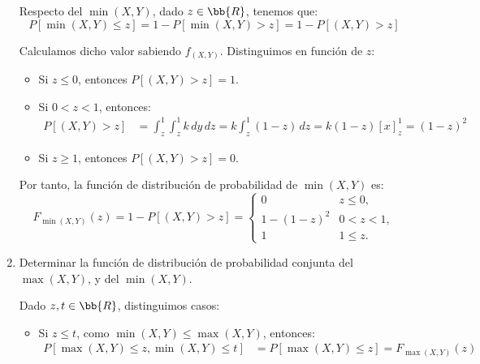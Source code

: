 \documentclass[12pt]{article}
\begin{document}
\begin{ejercicio}
\begin{enumerate}
            Respecto del $\min(X,Y)$, dado $z\in \bb{R}$, tenemos que:
            \begin{equation*}
                P[\min(X,Y)\leq z]=1-P[\min(X,Y)>z]=1-P[(X,Y)>z]
            \end{equation*}
    
            Calculamos dicho valor sabiendo $f_{(X,Y)}$. Distinguimos en función de $z$:
            \begin{itemize}
                \item Si $z\leq 0$, entonces $P[(X,Y)>z]=1$.
    
                \item Si $0<z<1$, entonces:
                \begin{align*}
                    P[(X,Y)>z]&=\int_{z}^{1}\int_{z}^{1} k \, dy \, dz = k\int_{z}^{1} (1-z) \, dz
                    = k(1-z)\left[x\right]_{z}^{1} = (1-z)^2
                \end{align*}
    
                \item Si $z\geq 1$, entonces $P[(X,Y)>z]=0$.
            \end{itemize}
    
            Por tanto, la función de distribución de probabilidad de $\min(X,Y)$ es:
            \begin{equation*}
                F_{\min(X,Y)}(z) = 1-P[(X,Y)>z]=\begin{cases}
                    0 & z\leq 0, \\
                    1-(1-z)^2 & 0<z<1, \\
                    1 & 1\leq z.
                \end{cases}
            \end{equation*}
    
            \item Determinar la función de distribución de probabilidad conjunta del $\max(X,Y)$, y del $\min(X,Y)$.
            
            Dado $z,t\in \bb{R}$, distinguimos casos:
            \begin{itemize}
                \item Si $z\leq t$, como $\min (X,Y)\leq \max(X,Y)$, entonces:
                \begin{align*}
                    P[\max(X,Y)\leq z,\min(X,Y)\leq t]&=P[\max(X,Y)\leq z] = F_{\max(X,Y)}(z)
                \end{align*}
    

\end{itemize}
\end{enumerate}
\end{ejercicio}
\end{document}
